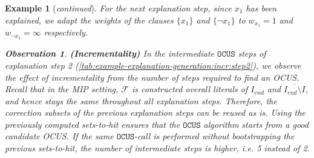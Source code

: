 \documentclass[twoside,11pt]{article}
\newcommand\m[1]{\mathcal{#1}}
\newtheorem{example}{Example}
\newtheorem{observation}[obs]{Observation}
\newcommand\Iend{\ensuremath{I_\mathit{end} }\xspace}
\newcommand\formula{\ensuremath{\m{F} }\xspace}
\newcommand\mm[1]{\ensuremath{#1}\xspace}
\newcommand\call[1]{\mm{\texttt{#1}}}
\newcommand\comus{\mm{\call{OCUS}}}
\begin{document}
\begin{example}[\textit{continued}]
For the next explanation step, since $x_1$ has been explained, we adapt the weights of the clauses $\{x_1\}$ and $\{\lnot x_1\}$ to $w_{x_1} = 1$ and $w_{\lnot x_1} = \infty$ respectively. 

\begin{observation}\textbf{(Incrementality)}
In the intermediate \comus steps of explanation step 2 (\cref{tab:example-explanation-generation:incr:step2}), we observe the effect of incrementality from the number of steps required to find an OCUS. 
Recall that in the MIP setting,  \formula is constructed overall literals of $\Iend$ and $\overline{\Iend \setminus I}$, and hence stays the same throughout all explanation steps. Therefore, the correction subsets of the previous explanation steps can be reused as is.
Using the previously computed sets-to-hit ensures that the \comus algorithm starts from a good candidate OCUS. If the same \comus-call is performed without bootstrapping the previous sets-to-hit, the number of intermediate steps is higher, i.e. 5 instead of 2.
\end{observation}


\end{example}
\end{document}
